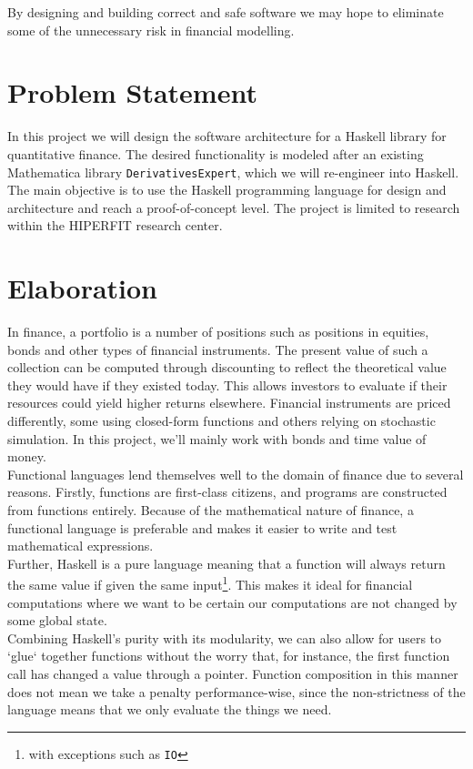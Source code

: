 \documentclass[11pt]{article}
\begin{document}
By designing and building correct and safe software we may hope to eliminate some
of the unnecessary risk in financial modelling.

\section*{Problem Statement}

In this project we will design the software architecture for a Haskell library for quantitative finance.
The desired functionality is modeled after an existing Mathematica library {\tt DerivativesExpert}, which
we will re-engineer into Haskell.
The main objective is to use the Haskell programming language for design and architecture and reach a proof-of-concept level.
The project is limited to research within the HIPERFIT research center.

\section*{Elaboration}

In finance, a portfolio is a number of positions such as positions in equities, bonds and other
types of financial instruments. The present value of such a collection can be computed through
discounting to reflect the theoretical value they would have if they existed today. This allows
investors to evaluate if their resources could yield higher returns elsewhere.
Financial instruments are priced differently, some using closed-form functions and
others relying on stochastic simulation. In this project, we'll mainly work with bonds and
time value of money.\\

Functional languages lend themselves well to the domain of finance due
to several reasons. Firstly, functions are first-class citizens, and programs are constructed
from functions entirely. Because of the mathematical nature of finance, a functional
language is preferable and makes it easier to write and test mathematical expressions.\\

Further, Haskell is a pure language meaning that a function will always return the same value
if given the same input\footnote{with exceptions such as {\tt IO}}. This makes it ideal for
financial computations where we want to be certain our computations are not changed by some
global state.\\

Combining Haskell's purity with its modularity, we can also allow for users to `glue`
together functions without the worry that, for instance, the first function call has changed
a value through a pointer. Function composition in this manner does not mean we
take a penalty performance-wise, since the non-strictness of the language  means that
we only evaluate the things we need.\\
\end{document}
